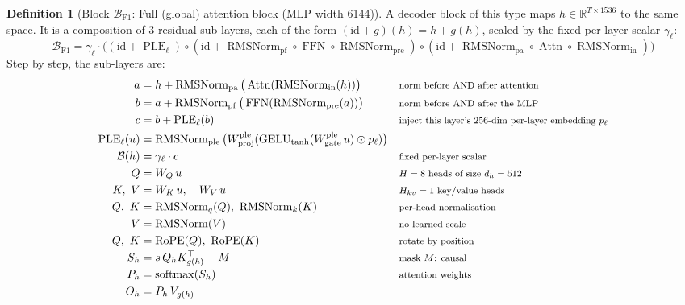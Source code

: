 \documentclass[10pt,a4paper]{article}
\newcommand{\op}[1]{\operatorname{#1}}
\theoremstyle{definition}
\newtheorem{definition}{Definition}[section]
\begin{document}
\begin{definition}[Block $\mathcal{B}_{\mathrm{F1}}$: Full (global) attention block (MLP width 6144)]
A decoder block of this type maps $h\in\mathbb{R}^{T\times 1536}$ to the same space. It is a composition of 3 residual sub-layers, each of the form $(\mathrm{id}+g)(h)=h+g(h)$, scaled by the fixed per-layer scalar $\gamma_\ell$:
\begin{equation}
  \mathcal{B}_{\mathrm{F1}} = \gamma_\ell\cdot\big((\mathrm{id}+\op{PLE}_\ell)\circ(\mathrm{id}+\op{RMSNorm}_{\mathrm{pf}}\circ\op{FFN}\circ \op{RMSNorm}_{\mathrm{pre}})\circ(\mathrm{id}+\op{RMSNorm}_{\mathrm{pa}}\circ \op{Attn}\circ \op{RMSNorm}_{\mathrm{in}})\big)
\end{equation}
Step by step, the sub-layers are:
\begin{align*}
  a &= h + \op{RMSNorm}_{\mathrm{pa}}\big(\op{Attn}(\op{RMSNorm}_{\mathrm{in}}(h))\big) && \text{\footnotesize norm before AND after attention} \\
  b &= a + \op{RMSNorm}_{\mathrm{pf}}\big(\op{FFN}(\op{RMSNorm}_{\mathrm{pre}}(a))\big) && \text{\footnotesize norm before AND after the MLP} \\
  c &= b + \op{PLE}_\ell(b) && \text{\footnotesize inject this layer's 256-dim per-layer embedding $p_\ell$} \\
  \op{PLE}_\ell(u) &= \op{RMSNorm}_{\mathrm{ple}}\big(W^{\mathrm{ple}}_{\mathrm{proj}}(\op{GELU}_{\tanh}(W^{\mathrm{ple}}_{\mathrm{gate}}\,u)\odot p_\ell)\big) \\
  \mathcal{B}(h) &= \gamma_\ell\cdot c && \text{\footnotesize fixed per-layer scalar} \\
  Q &= W_Q\,u && \text{\footnotesize $H=8$ heads of size $d_h=512$} \\
  K,\ V &= W_K\,u,\quad W_V\,u && \text{\footnotesize $H_{kv}=1$ key/value heads} \\
  Q,\ K &= \op{RMSNorm}_q(Q),\ \op{RMSNorm}_k(K) && \text{\footnotesize per-head normalisation} \\
  V &= \op{RMSNorm}(V) && \text{\footnotesize no learned scale} \\
  Q,\ K &= \op{RoPE}(Q),\ \op{RoPE}(K) && \text{\footnotesize rotate by position} \\
  S_h &= s\, Q_h K_{g(h)}^{\top} + M && \text{\footnotesize mask $M$: causal} \\
  P_h &= \op{softmax}(S_h) && \text{\footnotesize attention weights} \\
  O_h &= P_h\, V_{g(h)} \\

\end{align*}
\end{definition}
\end{document}
